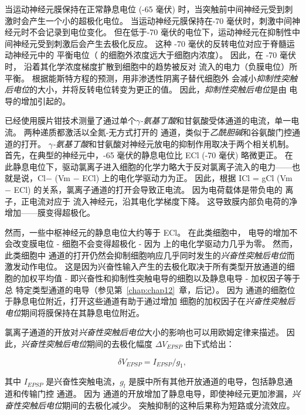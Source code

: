 当运动神经元膜保持在正常静息电位 (-65 毫伏) 时，当突触前中间神经元受到刺激时会产生一个小的超极化电位。
当运动神经元膜保持在-70 毫伏时，刺激中间神经元时不会记录到电位变化。
但在低于-70 毫伏的电位下，运动神经元在抑制性中间神经元受到刺激后会产生去极化反应。
这种 -70 毫伏的反转电位对应于脊髓运动神经元中的  平衡电位（ 的细胞外浓度远大于细胞内浓度）。
因此，在 -70 毫伏时， 沿着其化学浓度梯度扩散到细胞中的趋势被反对  流入的电力（负膜电位）所平衡。
根据能斯特方程的预测，用非渗透性阴离子替代细胞外  会减小\textit{抑制性突触后电位}的大小，并将反转电位转变为更正的值。
因此，\textit{抑制性突触后电位}是由  电导的增加引起的。


已经使用膜片钳技术测量了通过单个\textit{$\gamma$-氨基丁酸}和甘氨酸受体通道的电流，单一电流。
两种递质都激活以全氮-无方式打开的  通道，类似于\textit{乙酰胆碱}和谷氨酸门控通道的打开。
\textit{$\gamma$-氨基丁酸}和甘氨酸对神经元放电的抑制作用取决于两个相关机制。
首先，在典型的神经元中，-65 毫伏的静息电位比 ECl (-70 毫伏) 略微更正。
在此静息电位下，驱动氯离子进入细胞的化学力略大于反对氯离子流入的电力——也就是说，Cl− (Vm − ECl) 上的电化学驱动力为正。
因此，根据 ICl = gCl (Vm − ECl) 的关系，氯离子通道的打开会导致正电流。 因为电荷载体是带负电的  离子，正电流对应于  流入神经元，沿其电化学梯度下降。
这导致膜内部负电荷的净增加——膜变得超极化。


然而，一些中枢神经元的静息电位大约等于 ECl。 在此类细胞中， 电导的增加不会改变膜电位 - 细胞不会变得超极化 - 因为  上的电化学驱动力几乎为零。
然而，此类细胞中  通道的打开仍然会抑制细胞响应几乎同时发生的\textit{兴奋性突触后电位}而激发动作电位。
这是因为兴奋性输入产生的去极化取决于所有类型开放通道的细胞的加权平均值 - 即兴奋性和抑制性突触电导的细胞以及静息电导 - 加权因子等于总 特定类型通道的电导（参见第~\ref{chap:chap12}~章，后记）。
因为  通道的细胞位于静息电位附近，打开这些通道有助于通过增加  细胞的加权因子在\textit{兴奋性突触后电位}期间将膜保持在其静息电位附近。


氯离子通道的开放对\textit{兴奋性突触后电位}大小的影响也可以用欧姆定律来描述。
因此，\textit{兴奋性突触后电位}期间的去极化幅度 $ \Delta V_{EPSP} $ 由下式给出：


\begin{equation}\label{depolarization_amplitude}
	\delta V_{EPSP} = I_{EPSP} / g_1,
\end{equation}


其中 $ I_{EPSP} $ 是兴奋性突触电流，$ g_l $ 是膜中所有其他开放通道的电导，包括静息通道和传输门控  通道。 因为  通道的开放增加了静息电导，即使神经元更加渗漏，\textit{兴奋性突触后电位}期间的去极化减少。
突触抑制的这种后果称为短路或分流效应。


